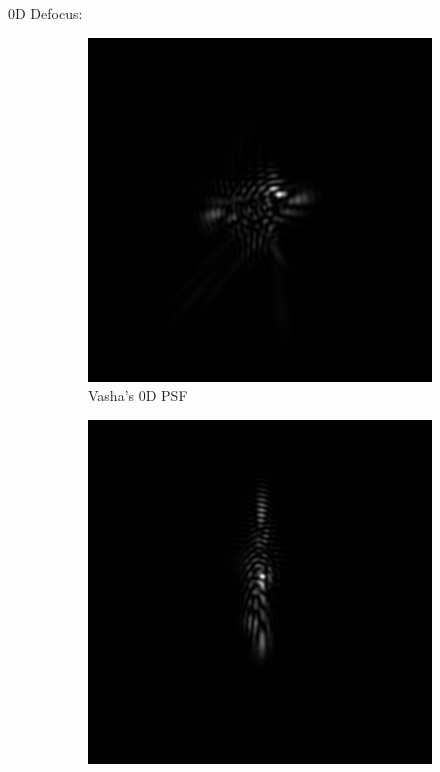 \documentclass{article}
\begin{document}
0D Defocus:
\begin{figure}[H]

\begin{subfigure}{.3\textwidth}
  \centering
  \includegraphics[width=1\linewidth]{Vasha_R_G_0530_2_500_zer_0_5_PSF.png}
  \caption{Vasha's 0D PSF}
  \label{fig:vasha0dpsf}
\end{subfigure}
\begin{subfigure}{.3\textwidth}
  \centering
  \includegraphics[width=1\linewidth]{Liz_R_G_0523_2_500_zer_0_5_PSF.png}

\end{subfigure}
\end{figure}
\end{document}
